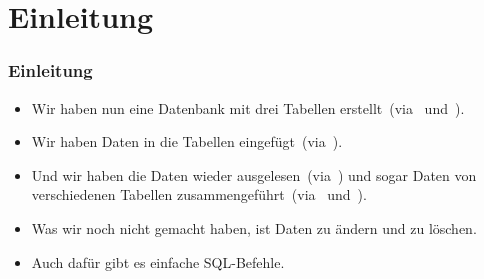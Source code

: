 \documentclass[aspectratio=169,mathserif,notheorems]{beamer}%
\subtitle{13.~Fabrik-Datenbank:~Daten ändern und löschen}%
\begin{document}
%
%
\startPresentation%
%
\section{Einleitung}%
%
\begin{frame}%
\frametitle{Einleitung}%
\begin{itemize}%
\item Wir haben nun eine Datenbank mit drei Tabellen erstellt~(via~ und~).%
\item<2-> Wir haben Daten in die Tabellen eingefügt~(via~).%
\item<3-> Und wir haben die Daten wieder ausgelesen~(via~) und sogar Daten von verschiedenen Tabellen zusammengeführt~(via~ und~).%
\item<4-> Was wir noch nicht gemacht haben, ist Daten zu ändern und zu löschen.%
\item<5-> Auch dafür gibt es einfache SQL-Befehle.%
\end{itemize}%
\end{frame}%
%
\end{document}
